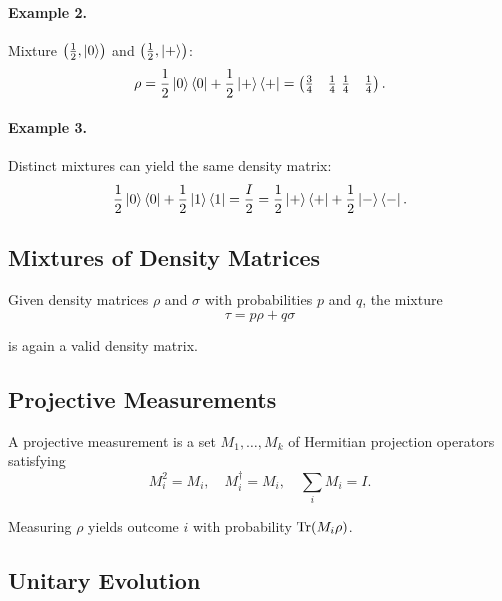 \paragraph{Example 2.} Mixture $\left(\tfrac12,\ket{0}\right)$ and $\left(\tfrac12,\ket{+}\right)$:
\begin{equation}
  \rho = \frac12 \ket{0}\bra{0} + \frac12 \ket{+}\bra{+} = \begin{pmatrix} \tfrac34 & \tfrac14 \ \tfrac14 & \tfrac14 \end{pmatrix}.
\end{equation}

\paragraph{Example 3.} Distinct mixtures can yield the same density matrix:
\begin{equation}
  \frac12 \ket{0}\bra{0} + \frac12 \ket{1}\bra{1} = \frac{I}{2} = \frac12 \ket{+}\bra{+} + \frac12 \ket{-}\bra{-}.
\end{equation}

\subsection{Mixtures of Density Matrices}

Given density matrices $\rho$ and $\sigma$ with probabilities $p$ and $q$, the mixture
\begin{equation}
  \tau = p\rho + q\sigma
\end{equation}

is again a valid density matrix.

\subsection{Projective Measurements}

A projective measurement is a set ${M_1,\ldots,M_k}$ of Hermitian projection operators satisfying
\begin{equation}
  M_i^2 = M_i, \quad M_i^\dagger = M_i, \quad \sum_i M_i = I.
\end{equation}

Measuring $\rho$ yields outcome $i$ with probability $\Tr(M_i \rho)$.

\subsection{Unitary Evolution}

